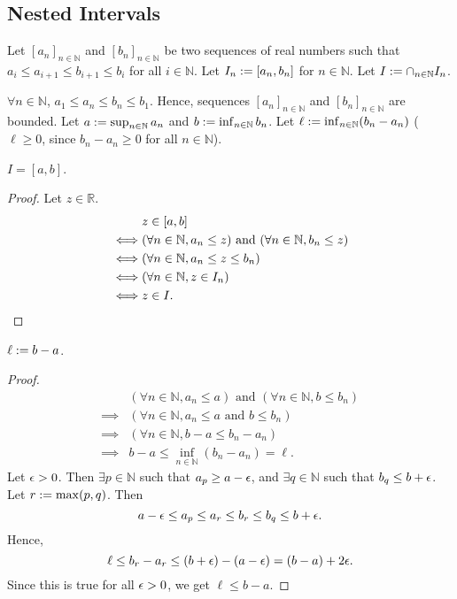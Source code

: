 \documentclass[a4paper, 12pt, fleqn]{article}
\begin{document}
\subsection{Nested Intervals}

Let $[a_n]_{n \in \mathbb{N}}$ and $[b_n]_{n \in \mathbb{N}}$ be two sequences of real numbers
such that $a_i \le a_{i+1} \le b_{i+1} \le b_i$ for all $i \in \mathbb{N}$.
Let $I_n := [a_n, b_n]$ for $n \in \mathbb{N}$.
Let $I := \cap_{n \in \mathbb{N}} I_n$.

$\forall n \in \mathbb{N}$, $a_1 \le a_n \le b_n \le b_1$.
Hence, sequences $[a_n]_{n \in \mathbb{N}}$ and $[b_n]_{n \in \mathbb{N}}$ are bounded.
Let $a := \sup_{n \in \mathbb{N}} a_n$ and $b := \inf_{n \in \mathbb{N}} b_n$.
Let $\ell := \inf_{n \in \mathbb{N}} (b_n - a_n)$
($\ell \ge 0$, since $b_n - a_n \ge 0$ for all $n \in \mathbb{N}$).

\begin{lemma}
$I = [a, b]$.
\end{lemma}
\begin{proof}
Let $z \in \mathbb{R}$.
\begin{align*}
& z \in [a, b]
\\ \iff & (\forall n \in \mathbb{N}, a_n \le z) \textrm{ and } (\forall n \in \mathbb{N}, b_n \le z)
\\ \iff & (\forall n \in \mathbb{N}, a_n \le z \le b_n)
\\ \iff & (\forall n \in \mathbb{N}, z \in I_n)
\\ \iff & z \in I.
\qedhere
\end{align*}
\end{proof}

\begin{lemma}
$\ell := b-a$.
\end{lemma}
\begin{proof}
\begin{align*}
& (\forall n \in \mathbb{N}, a_n \le a) \textrm{ and } (\forall n \in \mathbb{N}, b \le b_n)
\\ \implies & (\forall n \in \mathbb{N}, a_n \le a \textrm{ and } b \le b_n)
\\ \implies & (\forall n \in \mathbb{N}, b - a \le b_n - a_n )
\\ \implies & b - a \le \inf_{n \in \mathbb{N}} (b_n - a_n) = \ell.
\end{align*}
Let $\epsilon > 0$. Then $\exists p \in \mathbb{N}$ such that $a_p \ge a - \epsilon$,
and $\exists q \in \mathbb{N}$ such that $b_q \le b + \epsilon$.
Let $r := \max(p, q)$. Then
\[ a - \epsilon \le a_p \le a_r \le b_r \le b_q \le b + \epsilon. \]
Hence,
\[ \ell \le b_r - a_r \le (b + \epsilon) - (a - \epsilon) = (b-a) + 2\epsilon. \]
Since this is true for all $\epsilon > 0$, we get $\ell \le b-a$.
\end{proof}
\end{document}
